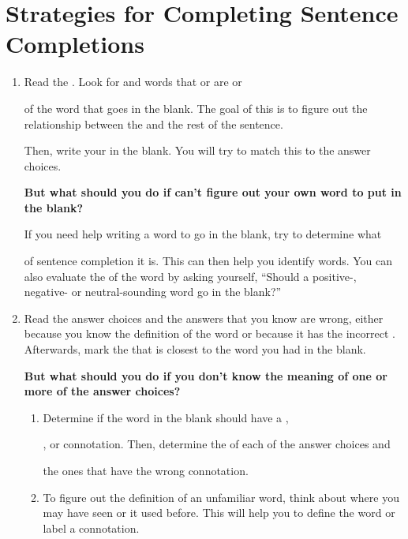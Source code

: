 \documentclass[12pt]{book}
\newcommand{\longline}{\underline{\hspace{2in}} }
\begin{document}
\section[Strategies]{Strategies for Completing Sentence Completions}

\begin{enumerate}
\item{Read the \longline. Look for \longline and words that \longline or are \longline or

\longline of the word that goes in the blank. The goal of this is to figure out the relationship between the \longline and the rest of the sentence.}

\bigskip
Then, write your \longline in the blank. You will try to match this to the answer choices.

\bigskip
\textbf{But what should you do if can't figure out your own word to put in the blank?}

\bigskip
{If you need help writing a word to go in the blank, try to determine what

\longline of sentence completion it is. This can then help you identify \longline words. You can also evaluate the \longline of the word by asking yourself, ``Should a positive-, negative- or neutral-sounding word go in the blank?''}

\item{Read the answer choices and \longline the answers that you know are wrong, either because you know the definition of the word or because it has the incorrect \longline.}\\  Afterwards, mark the \longline that is closest to the word you had in the blank.

\textbf{But what should you do if you don't know the meaning of one or more of the answer choices?}

\begin{enumerate}[label=(\Alph*)]
\item Determine if the word in the blank should have a \longline,

\longline, or \longline connotation. Then, determine the \longline of each of the answer choices and

\longline the ones that have the wrong connotation.

\item To figure out the definition of an unfamiliar word, think about where you may have seen or \longline it used before. This will help you to define the word or label a connotation.


\end{enumerate}
\end{enumerate}
\end{document}

